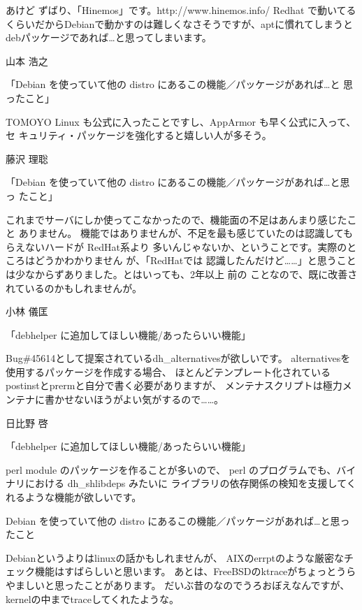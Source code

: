 \documentclass[cjk,dvipdfmx,12pt]{beamer}
\begin{document}
\begin{frame}{あけど}
ずばり、「Hinemos」です。http://www.hinemos.info/
Redhat で動いてるくらいだからDebianで動かすのは難しくなさそうですが、aptに慣れてしまうとdebパッケージであれば…と思ってしまいます。

\end{frame}\begin{frame}{山本 浩之}

「Debian を使っていて他の distro にあるこの機能／パッケージがあれば…と
思ったこと」

TOMOYO Linux も公式に入ったことですし、AppArmor も早く公式に入って、セ
キュリティ・パッケージを強化すると嬉しい人が多そう。

\end{frame}\begin{frame}{藤沢 理聡}


「Debian を使っていて他の distro にあるこの機能／パッケージがあれば…と思っ 
たこと」

これまでサーバにしか使ってこなかったので、機能面の不足はあんまり感じたこと 
ありません。
機能ではありませんが、不足を最も感じていたのは認識してもらえないハードが 
RedHat系より
多いんじゃないか、ということです。実際のところはどうかわかりません 
が、「RedHatでは
認識したんだけど……」と思うことは少なからずありました。とはいっても、2年以上 
前の
ことなので、既に改善されているのかもしれませんが。

\end{frame}\begin{frame}{小林 儀匡}

「debhelper に追加してほしい機能/あったらいい機能」

Bug\#45614として提案されているdh\_{}alternativesが欲しいです。
alternativesを使用するパッケージを作成する場合、
ほとんどテンプレート化されているpostinstとprermと自分で書く必要がありますが、
メンテナスクリプトは極力メンテナに書かせないほうがよい気がするので……。


\end{frame}\begin{frame}{日比野 啓}

「debhelper に追加してほしい機能/あったらいい機能」

perl module のパッケージを作ることが多いので、
perl のプログラムでも、バイナリにおける dh\_{}shlibdeps みたいに
ライブラリの依存関係の検知を支援してくれるような機能が欲しいです。

Debian を使っていて他の distro にあるこの機能／パッケージがあれば…と思ったこと

Debianというよりはlinuxの話かもしれませんが、
AIXのerrptのような厳密なチェック機能はすばらしいと思います。
あとは、FreeBSDのktraceがちょっとうらやましいと思ったことがあります。
だいぶ昔のなのでうろおぼえなんですが、kernelの中までtraceしてくれたような。


\end{frame}
\end{document}
